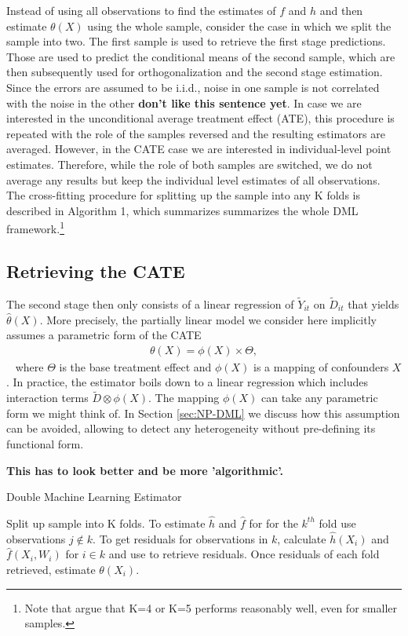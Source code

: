 Instead of using all observations to find the estimates of $f$ and $h$ and then estimate $\theta(X)$ using the whole sample, consider the case in which we split the sample into two. The first sample is used to retrieve the first stage predictions. Those are used to predict the conditional means of the second sample, which are then subsequently used for orthogonalization and the second stage estimation. Since the errors are assumed to be i.i.d., noise in one sample is not correlated with the noise in the other \textbf{don't like this sentence yet}. In case we are interested in the unconditional average treatment effect (ATE), this procedure is repeated with the role of the samples reversed and the resulting estimators are averaged. However, in the CATE case we are interested in individual-level point estimates. Therefore, while the role of both samples are switched, we do not average any results but keep the individual level estimates of all observations. The cross-fitting procedure for splitting up the sample into any K folds is described in Algorithm 1, which summarizes summarizes the whole DML framework.\footnote{Note that \cite{DML2017} argue that K=4 or K=5 performs reasonably well, even for smaller samples.} 

\subsection{Retrieving the CATE}
The second stage then only consists of a linear regression of $\tilde{Y}_{it}$ on $\tilde{D}_{it}$ that yields $\hat{\theta}(X)$. More precisely, the partially linear model we consider here implicitly assumes a parametric form of the CATE 
\begin{align*} 
    \theta(X)=\phi(X) \times \Theta,
\end{align*} 
where $\Theta$ is the base treatment effect and $\phi(X)$ is a mapping of confounders $X$. In practice, the estimator boils down to a linear regression which includes interaction terms $\tilde{D} \otimes \phi(X)$. The mapping $\phi(X)$ can take any parametric form we might think of. In Section \ref{sec:NP-DML} we discuss how this assumption can be avoided, allowing to detect any heterogeneity without pre-defining its functional form. 

\textbf{This has to look better and be more 'algorithmic'.}
\begin{algorithm}
    \caption{Double Machine Learning Estimator}
    \begin{algorithmic}[1]
        \State Split up sample into K folds. 
        \State To estimate $\widehat{h}$ and $\widehat{f}$ for for the $k^{th}$ fold use observations $j \notin k$. 
        \State To get residuals for observations in $k$, calculate $\widehat{h}(X_i)$ and $\widehat{f}(X_i, W_i)$ for $i \in k$ and use to retrieve residuals.
        \State Once residuals of each fold retrieved, estimate $\theta(X_i)$.
    \end{algorithmic}
\end{algorithm}

